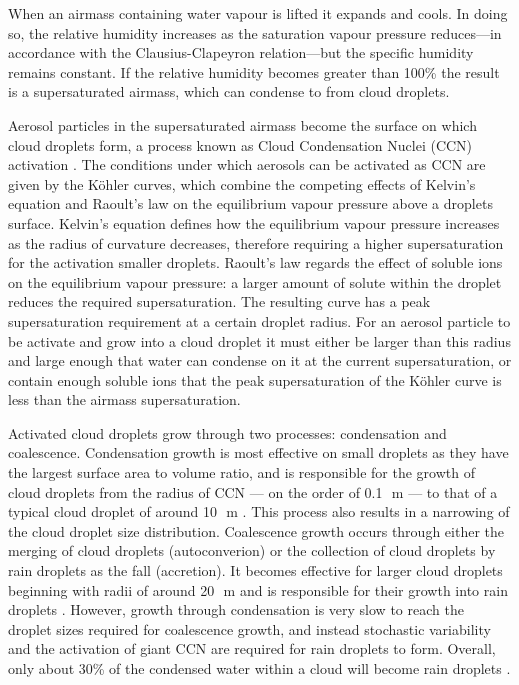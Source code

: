 When an airmass containing water vapour is lifted it expands and cools.
In doing so, the relative humidity increases as the saturation vapour pressure reduces---in accordance with the Clausius-Clapeyron relation---but the specific humidity remains constant. 
If the relative humidity becomes greater than 100\% the result is a supersaturated airmass, which can condense to from cloud droplets.

Aerosol particles  in the supersaturated airmass become the surface on which cloud droplets form, a process known as Cloud Condensation Nuclei (CCN) activation \citep{acci}.
The conditions under which aerosols can be activated as CCN are given by the K{\"o}hler curves, which combine the competing effects of Kelvin's equation and Raoult's law on the equilibrium vapour pressure above a droplets surface. 
Kelvin's equation defines how the equilibrium vapour pressure increases as the radius of curvature decreases, therefore requiring a higher supersaturation for the activation smaller droplets. 
Raoult's law regards the effect of soluble ions on the equilibrium vapour pressure: a larger amount of solute within the droplet reduces the required supersaturation. The resulting curve has a peak supersaturation requirement at a certain droplet radius. 
For an aerosol particle to be activate and grow into a cloud droplet it must either be larger than this radius and large enough that water can condense on it at the current supersaturation, or contain enough soluble ions that the peak supersaturation of the K{\"o}hler curve is less than the airmass supersaturation.

Activated cloud droplets grow through two processes: condensation and coalescence. 
Condensation growth is most effective on small droplets as they have the largest surface area to volume ratio, and is responsible for the growth of cloud droplets from the radius of CCN --- on the order of 0.1\,\unit{\mu m} --- to that of a typical cloud droplet of around 10\,\unit{\mu m} \citep{cloud_physics}. 
This process also results in a narrowing of the cloud droplet size distribution. 
Coalescence growth occurs through either the merging of cloud droplets (autoconverion) or the collection of cloud droplets by rain droplets as the fall (accretion).
It becomes effective for larger cloud droplets beginning with radii of around 20\,\unit{\mu m} and is responsible for their growth into rain droplets \citep{cloud_physics}.
However, growth through condensation is very slow to reach the droplet sizes required for coalescence growth, and instead stochastic variability and the activation of giant CCN \citep{feingold_impact_1999} are required for rain droplets to form. 
Overall, only about 30\% of the condensed water within a cloud will become rain droplets \citep{trenberth_changing_2003}.






